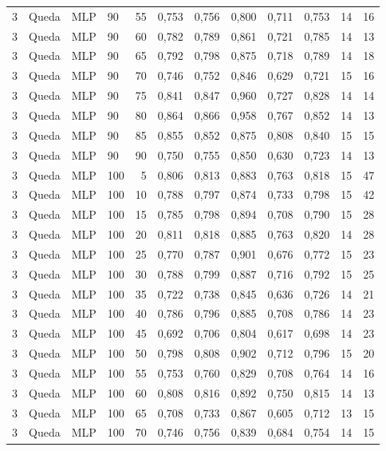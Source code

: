 \begin{longtable}{ccclrrrrrrrr}
3 & Queda & MLP & 90 & 55 & 0,753 & 0,756 & 0,800 & 0,711 & 0,753 & 14 & 16 \\
3 & Queda & MLP & 90 & 60 & 0,782 & 0,789 & 0,861 & 0,721 & 0,785 & 14 & 13 \\
3 & Queda & MLP & 90 & 65 & 0,792 & 0,798 & 0,875 & 0,718 & 0,789 & 14 & 18 \\
3 & Queda & MLP & 90 & 70 & 0,746 & 0,752 & 0,846 & 0,629 & 0,721 & 15 & 16 \\
3 & Queda & MLP & 90 & 75 & 0,841 & 0,847 & 0,960 & 0,727 & 0,828 & 14 & 14 \\
3 & Queda & MLP & 90 & 80 & 0,864 & 0,866 & 0,958 & 0,767 & 0,852 & 14 & 13 \\
3 & Queda & MLP & 90 & 85 & 0,855 & 0,852 & 0,875 & 0,808 & 0,840 & 15 & 15 \\
3 & Queda & MLP & 90 & 90 & 0,750 & 0,755 & 0,850 & 0,630 & 0,723 & 14 & 13 \\
3 & Queda & MLP & 100 & 5 & 0,806 & 0,813 & 0,883 & 0,763 & 0,818 & 15 & 47 \\
3 & Queda & MLP & 100 & 10 & 0,788 & 0,797 & 0,874 & 0,733 & 0,798 & 15 & 42 \\
3 & Queda & MLP & 100 & 15 & 0,785 & 0,798 & 0,894 & 0,708 & 0,790 & 15 & 28 \\
3 & Queda & MLP & 100 & 20 & 0,811 & 0,818 & 0,885 & 0,763 & 0,820 & 14 & 28 \\
3 & Queda & MLP & 100 & 25 & 0,770 & 0,787 & 0,901 & 0,676 & 0,772 & 15 & 23 \\
3 & Queda & MLP & 100 & 30 & 0,788 & 0,799 & 0,887 & 0,716 & 0,792 & 15 & 25 \\
3 & Queda & MLP & 100 & 35 & 0,722 & 0,738 & 0,845 & 0,636 & 0,726 & 14 & 21 \\
3 & Queda & MLP & 100 & 40 & 0,786 & 0,796 & 0,885 & 0,708 & 0,786 & 14 & 23 \\
3 & Queda & MLP & 100 & 45 & 0,692 & 0,706 & 0,804 & 0,617 & 0,698 & 14 & 23 \\
3 & Queda & MLP & 100 & 50 & 0,798 & 0,808 & 0,902 & 0,712 & 0,796 & 15 & 20 \\
3 & Queda & MLP & 100 & 55 & 0,753 & 0,760 & 0,829 & 0,708 & 0,764 & 14 & 16 \\
3 & Queda & MLP & 100 & 60 & 0,808 & 0,816 & 0,892 & 0,750 & 0,815 & 14 & 13 \\
3 & Queda & MLP & 100 & 65 & 0,708 & 0,733 & 0,867 & 0,605 & 0,712 & 13 & 15 \\
3 & Queda & MLP & 100 & 70 & 0,746 & 0,756 & 0,839 & 0,684 & 0,754 & 14 & 15 \\

\end{longtable}
